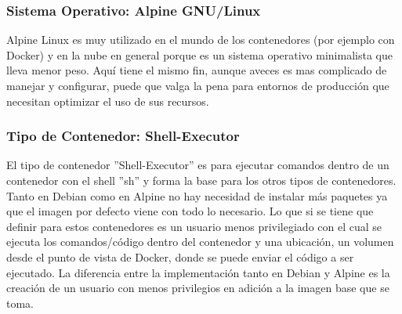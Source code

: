 \subsubsection{Sistema Operativo: Alpine GNU/Linux}
Alpine Linux es muy utilizado en el mundo de los contenedores (por ejemplo con Docker) y en la nube en general porque es un sistema operativo minimalista que lleva menor peso. Aquí tiene el mismo fin, aunque aveces es mas complicado de manejar y configurar, puede que valga la pena para entornos de producción que necesitan optimizar el uso de sus recursos.

\subsubsection{Tipo de Contenedor: Shell-Executor}
El tipo de contenedor ''Shell-Executor'' es para ejecutar comandos dentro de un contenedor con el shell ''sh'' y forma la base para los otros tipos de contenedores. Tanto en Debian como en Alpine no hay necesidad de instalar más paquetes ya que el imagen por defecto viene con todo lo necesario. Lo que si se tiene que definir para estos contenedores es un usuario menos privilegiado con el cual se ejecuta los comandos/código dentro del contenedor y una ubicación, un volumen desde el punto de vista de Docker, donde se puede enviar el código a ser ejecutado. La diferencia entre la implementación tanto en Debian y Alpine es la creación de un usuario con menos privilegios en adición a la imagen base que se toma. 



